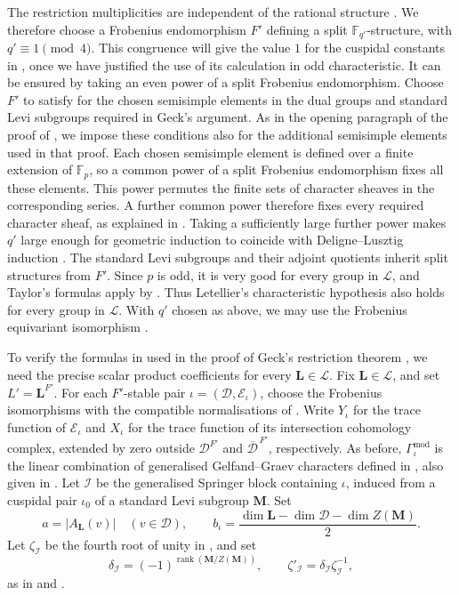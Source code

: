 \documentclass[10pt]{amsart}
\theoremstyle{definition}
\let\oldendproof\endproof
\renewenvironment{proof}[1][\proofname]{%
  \oldproof[\bfseries #1]%
}{\oldendproof}
\numberwithin{equation}{section}
\numberwithin{table}{section}
\begin{document}
\begin{proof}[Proof of Lemma~\ref{lem:type-b-isolated-coverage}]
The restriction multiplicities are independent of the rational structure
\cite[p.~151]{Geck1999GGGR}. We therefore choose a Frobenius endomorphism
$F'$ defining a split $\mathbb F_{q'}$-structure, with $q'\equiv1\pmod4$.
This congruence will give the value $1$ for the cuspidal constants in
\cite[Theorem~3.8]{Geck1999GGGR}, once we have justified the use of its
calculation in odd characteristic. It can be ensured by taking an even
power of a split Frobenius endomorphism.
Choose $F'$ to satisfy \cite[(4.7)(a)--(c)]{Geck1999GGGR} for the chosen
semisimple elements in the dual groups and standard Levi subgroups
required in Geck's argument. As in the opening paragraph of the proof of
\cite[Proposition~5.3]{Geck1999GGGR}, we impose these conditions also for
the additional semisimple elements used in that proof.
Each chosen semisimple element is defined over a finite extension of
$\mathbb F_p$, so a common power of a split Frobenius endomorphism fixes
all these elements. This power permutes the finite sets of character
sheaves in the corresponding series. A further common power therefore
fixes every required character sheaf, as explained in
\cite[(4.7)]{Geck1999GGGR}.
Taking a sufficiently large further power makes $q'$ large enough for
geometric induction to coincide with Deligne--Lusztig induction
\cite[p.~115]{Letellier2005}.
The standard Levi subgroups and their adjoint quotients inherit split
structures from $F'$. Since $p$ is odd, it is very good for every group
in $\mathscr L$, and Taylor's formulas apply by
\cite[Lemma~6.3(i)]{Taylor2016}. Thus Letellier's characteristic hypothesis
also holds for every group in $\mathscr L$. With $q'$ chosen as above,
we may use the Frobenius equivariant isomorphism
\cite[(6.2.11)]{Letellier2005}.

To verify the formulas in \cite[(2.4)]{Geck1999GGGR} used in the proof
of Geck's restriction theorem \cite[Theorem~4.5]{Geck1999GGGR}, we need
the precise scalar product coefficients for every $\mathbf L\in\mathscr L$.
Fix $\mathbf L\in\mathscr L$, and set $L'=\mathbf L^{F'}$.
For each $F'$-stable pair $\iota=(\mathcal D,\mathscr E_\iota)$, choose
the Frobenius isomorphisms with the compatible normalisations of
\cite[10.1--10.8]{Taylor2016}. Write $Y_\iota$ for the trace function of
$\mathscr E_\iota$ and $X_\iota$ for the trace function of its
intersection cohomology complex, extended by zero outside
$\mathcal D^{F'}$ and $\overline{\mathcal D}^{\,F'}$, respectively.
As before, $\Gamma_\iota^{\mathrm{mod}}$ is the linear combination of
generalised Gelfand--Graev characters defined in \cite[(11.15)]{Taylor2016},
also given in \cite[(2.3)(a)]{Geck1999GGGR}.
Let $\mathcal I$ be the generalised Springer block containing $\iota$,
induced from a cuspidal pair $\iota_0$ of a standard Levi subgroup
$\mathbf M$. Set
\[
 a=|A_{\mathbf L}(v)|\quad(v\in\mathcal D),
 \qquad
 b_\iota=\frac{\dim\mathbf L-\dim\mathcal D-\dim Z(\mathbf M)}2.
\]
Let $\zeta_{\mathcal I}$ be the fourth root of unity in
\cite[Proposition~11.5]{Taylor2016}, and set
\[
 \delta_{\mathcal I}=(-1)^{\operatorname{rank}(\mathbf M/Z(\mathbf M))},
 \qquad
 \zeta'_{\mathcal I}=\delta_{\mathcal I}\zeta_{\mathcal I}^{-1},
\]
as in \cite[(8.4)(a)]{Lusztig1992Support} and \cite[(2.4)]{Geck1999GGGR}.


\end{proof}
\end{document}
